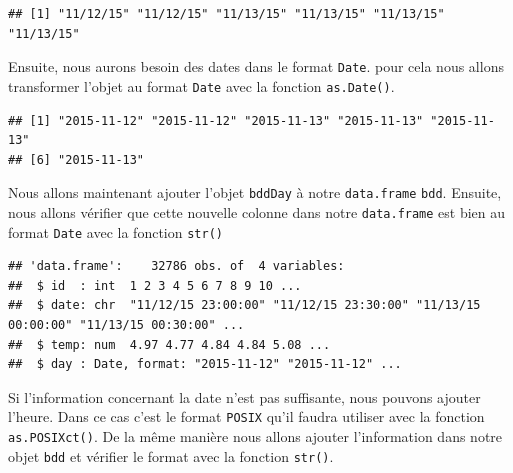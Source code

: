 \documentclass[]{book}
\newenvironment{Shaded}{\begin{snugshade}}{\end{snugshade}}
\newcommand{\DataTypeTok}[1]{\textcolor[rgb]{0.13,0.29,0.53}{#1}}
\newcommand{\DecValTok}[1]{\textcolor[rgb]{0.00,0.00,0.81}{#1}}
\newcommand{\KeywordTok}[1]{\textcolor[rgb]{0.13,0.29,0.53}{\textbf{#1}}}
\newcommand{\NormalTok}[1]{#1}
\newcommand{\OperatorTok}[1]{\textcolor[rgb]{0.81,0.36,0.00}{\textbf{#1}}}
\newcommand{\StringTok}[1]{\textcolor[rgb]{0.31,0.60,0.02}{#1}}
\begin{document}
\begin{verbatim}
## [1] "11/12/15" "11/12/15" "11/13/15" "11/13/15" "11/13/15" "11/13/15"
\end{verbatim}

Ensuite, nous aurons besoin des dates dans le format \texttt{Date}. pour cela nous allons transformer l'objet au format \texttt{Date} avec la fonction \texttt{as.Date()}.

\begin{Shaded}
\begin{Highlighting}[]
\NormalTok{bddDay <-}\StringTok{ }\KeywordTok{as.Date}\NormalTok{(}\KeywordTok{sapply}\NormalTok{(}\KeywordTok{strsplit}\NormalTok{(bdd[, }\DecValTok{2}\NormalTok{], }\DataTypeTok{split =} \StringTok{" "}\NormalTok{), }\StringTok{"[["}\NormalTok{, }\DecValTok{1}\NormalTok{), }\DataTypeTok{format =} \StringTok{"%
\KeywordTok{head}\NormalTok{(bddDay)}
\end{Highlighting}
\end{Shaded}

\begin{verbatim}
## [1] "2015-11-12" "2015-11-12" "2015-11-13" "2015-11-13" "2015-11-13"
## [6] "2015-11-13"
\end{verbatim}

Nous allons maintenant ajouter l'objet \texttt{bddDay} à notre \texttt{data.frame} \texttt{bdd}. Ensuite, nous allons vérifier que cette nouvelle colonne dans notre \texttt{data.frame} est bien au format \texttt{Date} avec la fonction \texttt{str()}

\begin{Shaded}
\end{Shaded}

\begin{verbatim}
## 'data.frame':    32786 obs. of  4 variables:
##  $ id  : int  1 2 3 4 5 6 7 8 9 10 ...
##  $ date: chr  "11/12/15 23:00:00" "11/12/15 23:30:00" "11/13/15 00:00:00" "11/13/15 00:30:00" ...
##  $ temp: num  4.97 4.77 4.84 4.84 5.08 ...
##  $ day : Date, format: "2015-11-12" "2015-11-12" ...
\end{verbatim}

Si l'information concernant la date n'est pas suffisante, nous pouvons ajouter l'heure. Dans ce cas c'est le format \texttt{POSIX} qu'il faudra utiliser avec la fonction \texttt{as.POSIXct()}. De la même manière nous allons ajouter l'information dans notre objet \texttt{bdd} et vérifier le format avec la fonction \texttt{str()}.
\end{document}
